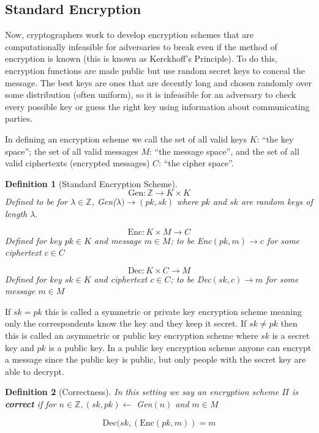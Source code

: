 \documentclass[12pt,twoside]{reedthesis}
\newtheorem{definition}{Definition}
\begin{document}
    \subsection{Standard Encryption}
    Now, cryptographers work to develop encryption schemes that are computationally infeasible for adversaries to break even if the method of encryption is known (this is known as Kerckhoff's Principle). To do this, encryption functions are made public but use random secret keys to conceal the message. The best keys are ones that are decently long and chosen randomly over some distribution (often uniform), so it is infeasible for an adversary to check every possible key or guess the right key using information about communicating parties.
       \par In defining an encryption scheme we call the set of all valid keys $K$: ``the key space''; the set of all valid messages $M$: ``the message space'', and the set of all valid ciphertexts (encrypted messages) $C$: ``the cipher space''.

\begin{definition}[Standard Encryption Scheme]
     
 
 $$\text{Gen}:\mathbb{Z} \rightarrow K \times K$$
 Defined to be for $\lambda \in \mathbb{Z}$, Gen($\lambda ) \rightarrow (pk,sk)$ where $pk$ and $sk$ are random keys of length $\lambda$.
 
  $$\text{Enc}:K \times M \rightarrow C$$
Defined for key $pk\in K$ and message $m\in M$; to be Enc$(pk,m) \rightarrow c$ for some ciphertext $c\in C$
 
 $$\text{Dec}:K \times C \rightarrow M$$
 Defined for key $sk \in K$ and ciphertext $c\in C$; to be Dec$(sk,c) \rightarrow m$ for some message $m\in M$
 
 \end{definition}
 
 
\par If $sk = pk$ this is called a symmetric or private key encryption scheme meaning only the correspondents know the key and they keep it secret. If $sk \not= pk$ then this is called an asymmetric or public key encryption scheme where $sk$ is a secret key and $pk$ is a public key. In a public key encryption scheme anyone can encrypt a message since the public key is public, but only people with the secret key are able to decrypt.


\begin{definition}[Correctness]
In this setting we say an encryption scheme $\Pi$ is \textbf{correct} if for $n\in \mathbb{Z} , (sk,pk) \leftarrow$ Gen$(n)$ and $m\in M$ 

$$\text{Dec}(sk, (\text{Enc}(pk,m)) = m$$
\end{definition}
\end{document}
